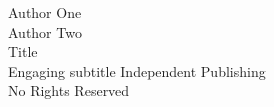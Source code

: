 \documentclass[../main.tex]{subfiles}
\begin{document}
	\begin{center}
		Author One\\
		Author Two\\
		\vfill
		\Huge
		Title\\
		\Large
		Engaging subtitle
		\vfill
		\small
		Independent Publishing\\
		No Rights Reserved
	\end{center}
\end{document}
